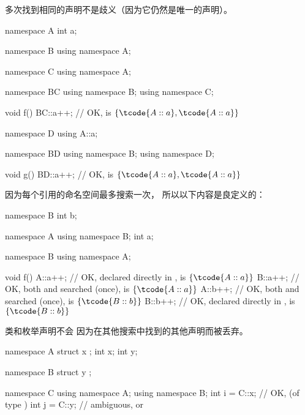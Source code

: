 \pnum
\begin{note}
多次找到相同的声明不是歧义（因为它仍然是唯一的声明）。
\begin{example}
\begin{codeblock}
namespace A {
  int a;
}

namespace B {
  using namespace A;
}

namespace C {
  using namespace A;
}

namespace BC {
  using namespace B;
  using namespace C;
}

void f()
{
  BC::a++;          // OK,  is $\{ \tcode{A::a}, \tcode{A::a} \}$
}

namespace D {
  using A::a;
}

namespace BD {
  using namespace B;
  using namespace D;
}

void g()
{
  BD::a++;          // OK,  is $\{ \tcode{A::a}, \tcode{A::a} \}$
}
\end{codeblock}
\end{example}
\end{note}

\pnum
\begin{example}
因为每个引用的命名空间最多搜索一次，
所以以下内容是良定义的：
\begin{codeblock}
namespace B {
  int b;
}

namespace A {
  using namespace B;
  int a;
}

namespace B {
  using namespace A;
}

void f()
{
  A::a++;           // OK,  declared directly in ,  is $\{ \tcode{A::a} \}$
  B::a++;           // OK, both  and  searched (once),  is $\{ \tcode{A::a} \}$
  A::b++;           // OK, both  and  searched (once),  is $\{ \tcode{B::b} \}$
  B::b++;           // OK,  declared directly in ,  is $\{ \tcode{B::b} \}$
}
\end{codeblock}
\end{example}

\pnum
\begin{note}
类和枚举声明不会
因为在其他搜索中找到的其他声明而被丢弃。
\end{note}
\begin{example}
\begin{codeblock}
namespace A {
  struct x { };
  int x;
  int y;
}

namespace B {
  struct y { };
}

namespace C {
  using namespace A;
  using namespace B;
  int i = C::x;     // OK,  (of type )
  int j = C::y;     // ambiguous,  or 
}
\end{codeblock}
\end{example}

